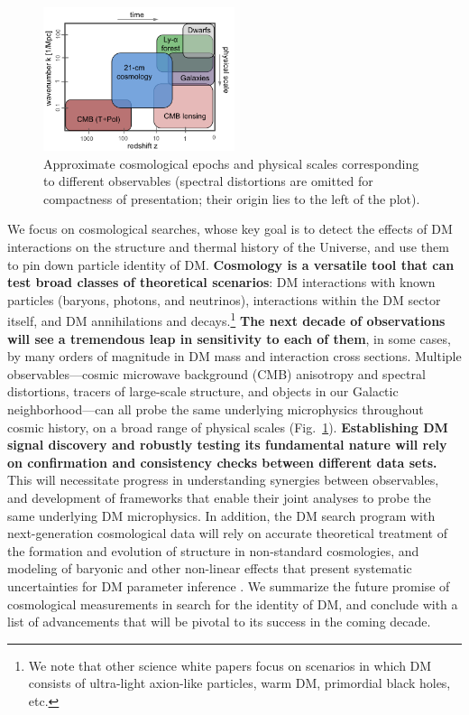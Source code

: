 \documentclass[12pt]{article}
\begin{document}
\begin{figure}
\begin{center}
\vspace{-0.9cm}
\includegraphics[width=0.5\textwidth]{scales.png}
\end{center}
\vspace{-0.8cm}
\caption{Approximate cosmological epochs and physical scales corresponding to different observables (spectral distortions are omitted for compactness of presentation; their origin lies to the left of the plot).}
\vspace{-0.2cm}
\label{fig:scales}
\end{figure}
We focus on cosmological searches, whose key goal is to detect the effects of DM interactions on the structure and thermal history of the Universe, and use them to pin down particle identity of DM.
\textbf{Cosmology is a versatile tool that can test broad classes of theoretical scenarios}: DM interactions with known particles (baryons, photons, and neutrinos), interactions within the DM sector itself, and DM annihilations and decays.\footnote{We note that other science white papers focus on scenarios in which DM consists of ultra-light axion-like particles, warm DM, primordial black holes, etc.}
\textbf{The next decade of observations will see a tremendous leap in sensitivity to each of them}, in some cases, by many orders of magnitude in DM mass and interaction cross sections.
Multiple observables---cosmic microwave background (CMB) anisotropy and spectral distortions, tracers of large-scale structure, and objects in our Galactic neighborhood---can all probe the same underlying microphysics throughout cosmic history, on a broad range of physical scales (Fig.~\ref{fig:scales}).
\textbf{Establishing DM signal discovery and robustly testing its fundamental nature will rely on confirmation and consistency checks between different data sets.}
This will necessitate progress in understanding synergies between observables, and development of frameworks that enable their joint analyses to probe the same underlying DM microphysics.
In addition, the DM search program with next-generation cosmological data will rely on accurate theoretical treatment of the formation and evolution of structure in non-standard cosmologies, and modeling of baryonic and other non-linear effects that present systematic uncertainties for DM parameter inference \cite{2019arXiv190201055D,2018PhRvD..98h3540M,AliHaimoud_19}.
We summarize the future promise of cosmological measurements in search for the identity of DM, and conclude with a list of advancements that will be pivotal to its success in the coming decade.
\vspace{-0.4cm}
\end{document}
